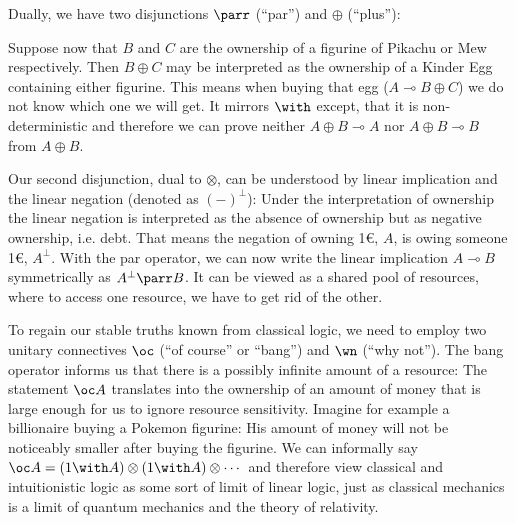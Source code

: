\documentclass[DIN, pagenumber=false, fontsize=11pt, parskip=half, colorinlistoftodos, svgnames]{scrartcl}
\begin{document}
	Dually, we have two disjunctions $\parr$ (“par”) and $\oplus$ (“plus”):
	
	Suppose now that $B$ and $C$ are the ownership of a figurine of Pikachu or Mew respectively. 
	Then $B \oplus C$ may be interpreted as the ownership of a Kinder Egg containing either figurine. 
	This means when buying that egg ($A \multimap B \oplus C$) we do not know which one we will get. 
	It mirrors $\with$ except, that it is non-deterministic and therefore we can prove neither $A \oplus B \multimap A$ nor $A \oplus B \multimap B$ from $A \oplus B$.
	
	Our second disjunction, dual to $\otimes$, can be understood by linear implication and the linear negation (denoted as $(-)^\bot$): 
	Under the interpretation of ownership the linear negation is interpreted as the absence of ownership but as negative ownership, i.e. debt. 
	That means the negation of owning 1\euro, $A$, is owing someone 1\euro, $A^\bot$. 
	With the par operator, we can now write the linear implication $A \multimap B$ symmetrically as $A^\bot \parr B$. 
	It can be viewed as a shared pool of resources, where  to access one resource, we have to get rid of the other.
	
	To regain our stable truths known from classical logic, we need to employ two unitary connectives $\oc$ (“of course” or “bang”) and $\wn$ (“why not”). 
	The bang operator informs us that there is a possibly infinite amount of a resource: 
	The statement $\oc A$ translates into the ownership of an amount of money that is large enough for us to ignore resource sensitivity. 
	Imagine for example a billionaire buying a Pokemon figurine: His amount of money will not be noticeably smaller after buying the figurine. We can informally say $\oc A = (1 \with A) \otimes (1 \with A) \otimes \cdots $ and therefore view classical and intuitionistic logic as some sort of limit of linear logic, just as classical mechanics is a limit of quantum mechanics and the theory of relativity. 
	
	
\end{document}
